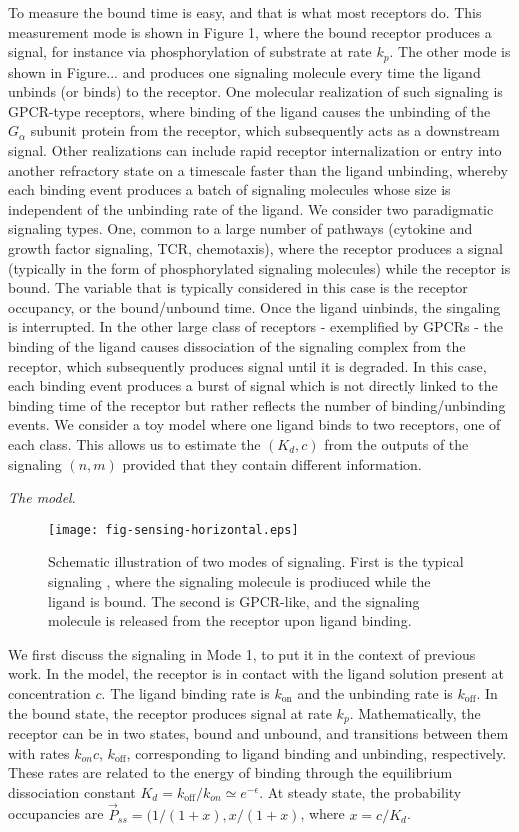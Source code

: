 \documentclass[prl,showpacs]{revtex4}
\begin{document}
To measure the bound time is easy, and that is what most receptors do. This measurement mode is shown in Figure 1, where the bound receptor produces a signal, for instance via phosphorylation of substrate at rate $k_p$. The other mode is shown in Figure... and produces one signaling molecule every time the ligand unbinds (or binds) to the receptor. One molecular realization of such signaling is GPCR-type receptors, where binding of the ligand causes the unbinding of the $G_{\alpha}$ subunit protein from the receptor, which subsequently acts as a downstream signal. Other realizations can include rapid receptor internalization or entry into another refractory state on a timescale faster than the ligand unbinding, whereby each binding event produces a batch of signaling molecules whose size is independent of the unbinding rate of the ligand. We consider two paradigmatic signaling types. One, common to a large number of pathways (cytokine and growth factor signaling, TCR, chemotaxis), where the receptor produces a signal (typically in the form of phosphorylated signaling molecules) while the receptor is bound. The variable that is typically considered in this case is the receptor occupancy, or the bound/unbound time. Once the ligand uinbinds, the singaling is interrupted. In the other large class of receptors - exemplified by GPCRs - the binding of the ligand causes dissociation of the signaling complex from the receptor, which subsequently produces signal until it is degraded. In this case, each binding event produces a burst of signal which is not directly linked to the binding time of the receptor but rather reflects the number of binding/unbinding events. We consider a toy model where one ligand binds to two receptors, one of each class. This allows us to estimate the $(K_d, c)$ from the outputs of the signaling $(n, m)$ provided that they contain different information.

\emph{The model}.


\begin{figure}
    \texttt{[image: fig-sensing-horizontal.eps]}
    \caption{Schematic illustration of two modes of signaling. First is the typical signaling , where the signaling molecule is prodiuced while the ligand is bound. The second is GPCR-like, and the signaling molecule is released from the receptor upon ligand binding.}
\end{figure}

We first discuss the signaling in Mode 1, to put it in the context of previous work. In the model, the receptor is in contact with the ligand solution present at concentration $c$. The ligand binding rate is $k_{\text{on}}$ and the unbinding rate is $k_{\text{off}}$. In the bound state, the receptor produces signal at rate $k_p$. Mathematically, the receptor can be in two states, bound and unbound, and transitions between them with rates $k_{on}c$, $k_{\text{off}}$, corresponding to ligand binding and unbinding, respectively. These rates are related to the energy of binding through the equilibrium dissociation constant $K_d=k_{\text{off}}/k_{on}\simeq e^{-\epsilon}$. At steady state, the probability occupancies are $\vec{P}_{ss}=(1/(1+x),x/(1+x)$, where $x=c/K_d$.
\end{document}

